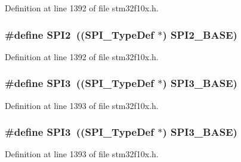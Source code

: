 Definition at line 1392 of file stm32f10x.\+h.

\subsubsection[{\texorpdfstring{S\+P\+I2}{SPI2}}]{\setlength{\rightskip}{0pt plus 5cm}\#define S\+P\+I2~(({\bf S\+P\+I\+\_\+\+Type\+Def} $\ast$) {\bf S\+P\+I2\+\_\+\+B\+A\+SE})}\hypertarget{group___peripheral__declaration_gaf2c3d8ce359dcfbb2261e07ed42af72b}{}\label{group___peripheral__declaration_gaf2c3d8ce359dcfbb2261e07ed42af72b}


Definition at line 1392 of file stm32f10x.\+h.

\subsubsection[{\texorpdfstring{S\+P\+I3}{SPI3}}]{\setlength{\rightskip}{0pt plus 5cm}\#define S\+P\+I3~(({\bf S\+P\+I\+\_\+\+Type\+Def} $\ast$) {\bf S\+P\+I3\+\_\+\+B\+A\+SE})}\hypertarget{group___peripheral__declaration_gab2339cbf25502bf562b19208b1b257fc}{}\label{group___peripheral__declaration_gab2339cbf25502bf562b19208b1b257fc}


Definition at line 1393 of file stm32f10x.\+h.

\subsubsection[{\texorpdfstring{S\+P\+I3}{SPI3}}]{\setlength{\rightskip}{0pt plus 5cm}\#define S\+P\+I3~(({\bf S\+P\+I\+\_\+\+Type\+Def} $\ast$) {\bf S\+P\+I3\+\_\+\+B\+A\+SE})}\hypertarget{group___peripheral__declaration_gab2339cbf25502bf562b19208b1b257fc}{}\label{group___peripheral__declaration_gab2339cbf25502bf562b19208b1b257fc}


Definition at line 1393 of file stm32f10x.\+h.

